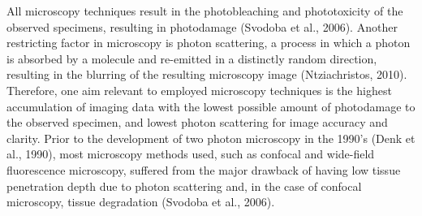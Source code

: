 \documentclass[11pt,titlepage]{article}
\begin{document}
All microscopy techniques result in the photobleaching and phototoxicity of the observed specimens, resulting in photodamage (Svodoba et al., 2006). Another restricting factor in microscopy is photon scattering, a process in which a photon is absorbed by a molecule and re-emitted in a distinctly random direction, resulting in the blurring of the resulting microscopy image (Ntziachristos, 2010). Therefore, one aim relevant to employed microscopy techniques is the highest accumulation of imaging data with the lowest possible amount of photodamage to the observed specimen, and lowest photon scattering for image accuracy and clarity. Prior to the development of two photon microscopy in the 1990's (Denk et al., 1990), most microscopy methods used, such as confocal and wide-field fluorescence microscopy, suffered from the major drawback of having low tissue penetration depth due to photon scattering and, in the case of confocal microscopy, tissue degradation (Svodoba et al., 2006).\par
\end{document}
